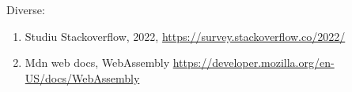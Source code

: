 \documentclass{article}
\begin{document}
\noindent Diverse:
\begin{enumerate}[noitemsep, leftmargin=0.3cm]
    \item \label{stackoverflow-studiu-2022} Studiu Stackoverflow, 2022, \href{https://survey.stackoverflow.co/2022/}{https://survey.stackoverflow.co/2022/}
    \item Mdn web docs, WebAssembly \href{https://developer.mozilla.org/en-US/docs/WebAssembly}{https://developer.mozilla.org/en-US/docs/WebAssembly}
\end{enumerate}
\end{document}
